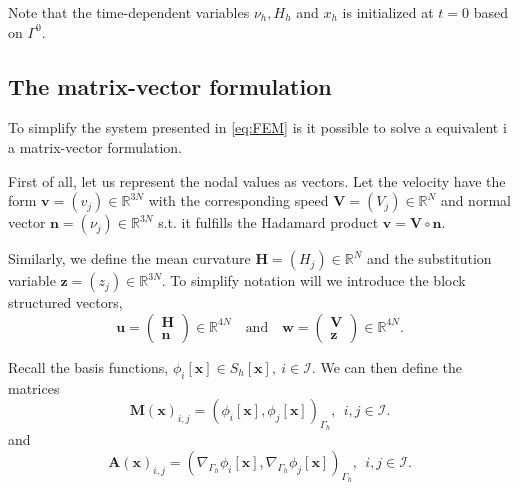 Note that the time-dependent variables $\nu_{h}, H_{h} $ and $x_{h}$ is initialized at $t=0$  based on $\Gamma ^{0}$.







\subsection{The matrix-vector formulation}%
\label{sub:the_matrix_formulation}

To simplify the system presented in \eqref{eq:FEM} is it possible to solve a equivalent i a matrix-vector formulation.

First of all, let us represent the nodal values as vectors. Let the velocity have the form $\mathbf{v} = \left( v_{j} \right) \in \mathbb{R} ^{3N}$ with the
corresponding speed $\mathbf{V} =
\left( V_{j} \right) \in \mathbb{R} ^{N} $ and normal vector $\mathbf{n} = \left( \nu _{j} \right) \in  \mathbb{R} ^{3N}$ s.t. it fulfills the Hadamard product $\mathbf{v} = \mathbf{V} \circ \mathbf{n}$.

Similarly, we define the mean curvature $\mathbf{H}  = ( H_{j})  \in  \mathbb{R} ^{N}  $ and the substitution variable
$\mathbf{z} = \left( z_{j} \right) \in \mathbb{R} ^{3N}$. To simplify notation will we introduce the block structured vectors,\[
\mathbf{u} = \begin{pmatrix}
\mathbf{H} \\
\mathbf{n}
\end{pmatrix}
\in \mathbb{R} ^{4N}
\quad \text{and} \quad \mathbf{w} = \begin{pmatrix}
\mathbf{V} \\
\mathbf{z}
\end{pmatrix}
\in \mathbb{R} ^{4N}.
\]

Recall the basis functions, $\phi_{i} \left[ \mathbf{x} \right] \in S_{h}\left[ \mathbf{x} \right], \   i \in \mathcal{I}  $. We can then define the matrices \[
\mathbf{M}\left( \mathbf{x} \right)_{i,j} =  \left( \phi _{i}\left[ \mathbf{x} \right], \phi_{j} \left[ \mathbf{x} \right] \right) _{ \Gamma _{h}},  \ \   i,j \in \mathcal{I}.
\]
and \[
\mathbf{A}\left( \mathbf{x} \right)_{i,j} = \left( \nabla _{\Gamma _{h}} \phi _{i} \left[ \mathbf{x} \right], \nabla _{\Gamma _{h}}\phi _{j} \left[ \mathbf{x} \right]  \right)_{\Gamma _{h}}, \ \    i,j \in \mathcal{I}.
\]

